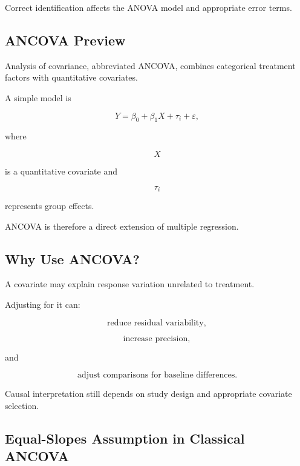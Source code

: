 Correct identification affects the ANOVA model and appropriate error
terms.

\subsection{ANCOVA Preview}
\label{subsec:ancova-preview}

Analysis of covariance, abbreviated ANCOVA, combines categorical
treatment factors with quantitative covariates.

A simple model is

\[
\boxed{
Y
=
\beta_0
+
\beta_1X
+
\tau_i
+
\varepsilon,
}
\]

where

\[
X
\]

is a quantitative covariate and

\[
\tau_i
\]

represents group effects.

ANCOVA is therefore a direct extension of multiple regression.

\subsection{Why Use ANCOVA?}
\label{subsec:why-use-ancova}

A covariate may explain response variation unrelated to treatment.

Adjusting for it can:

\[
\boxed{
\text{reduce residual variability},
}
\]

\[
\boxed{
\text{increase precision},
}
\]

and

\[
\boxed{
\text{adjust comparisons for baseline differences}.
}
\]

Causal interpretation still depends on study design and appropriate
covariate selection.

\subsection{Equal-Slopes Assumption in Classical ANCOVA}
\label{subsec:ancova-equal-slopes}

